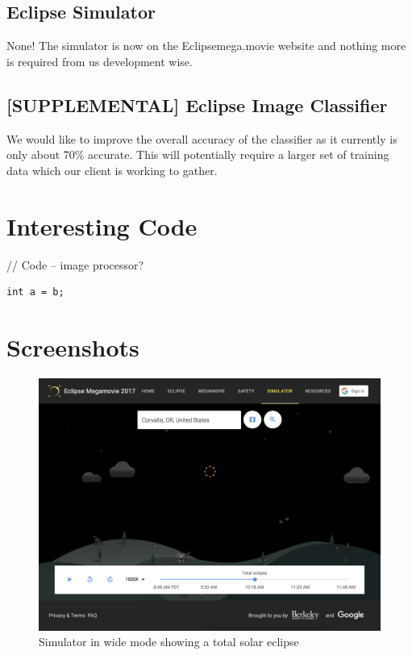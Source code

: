\documentclass[10pt, onecolumn, draftclsnofoot, letterpaper, compsoc]{IEEEtran}
\begin{document}
\subsection{Eclipse Simulator}

None! The simulator is now on the Eclipsemega.movie website and nothing more
is required from us development wise. \\

\subsection{[SUPPLEMENTAL] Eclipse Image Classifier}

We would like to improve the overall accuracy of the classifier as it currently
is only about 70\% accurate. This will potentially require a larger
set of training data which our client is working to gather. \\

\newpage
\section{Interesting Code}

// Code -- image processor?

\begin{verbatim}
int a = b;
\end{verbatim}

\newpage
\section{Screenshots}

\begin{figure}[!h]
	\begin{center}
  		\includegraphics[width=\textwidth]{sim_total.eps}
		\caption{Simulator in wide mode showing a total solar eclipse}
	\end{center}
\end{figure}
\newpage
\end{document}
